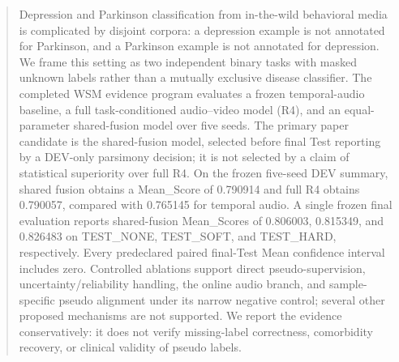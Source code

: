\begin{abstract}
Depression and Parkinson classification from in-the-wild behavioral media is complicated by disjoint corpora: a depression example is not annotated for Parkinson, and a Parkinson example is not annotated for depression. We frame this setting as two independent binary tasks with masked unknown labels rather than a mutually exclusive disease classifier. The completed WSM evidence program evaluates a frozen temporal-audio baseline, a full task-conditioned audio--video model (R4), and an equal-parameter shared-fusion model over five seeds. The primary paper candidate is the shared-fusion model, selected before final Test reporting by a DEV-only parsimony decision; it is not selected by a claim of statistical superiority over full R4. On the frozen five-seed DEV summary, shared fusion obtains a Mean\_Score of 0.790914 and full R4 obtains 0.790057, compared with 0.765145 for temporal audio. A single frozen final evaluation reports shared-fusion Mean\_Scores of 0.806003, 0.815349, and 0.826483 on TEST\_NONE, TEST\_SOFT, and TEST\_HARD, respectively. Every predeclared paired final-Test Mean confidence interval includes zero. Controlled ablations support direct pseudo-supervision, uncertainty/reliability handling, the online audio branch, and sample-specific pseudo alignment under its narrow negative control; several other proposed mechanisms are not supported. We report the evidence conservatively: it does not verify missing-label correctness, comorbidity recovery, or clinical validity of pseudo labels.
\end{abstract}
